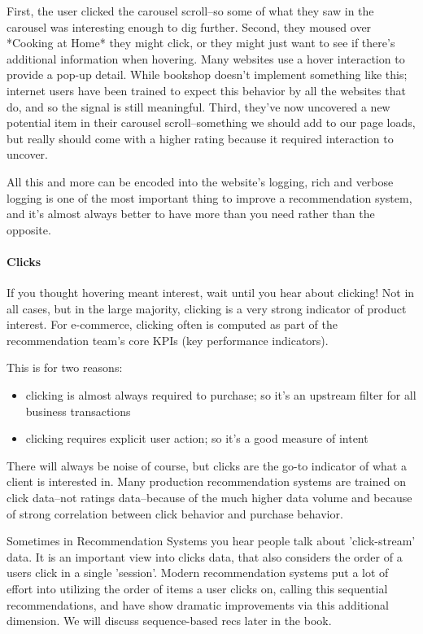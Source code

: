 First, the user clicked the carousel scroll–so some of what they saw in the carousel was interesting enough to dig further. Second, they moused over *Cooking at Home* they might click, or they might just want to see if there's additional information when hovering. Many websites use a hover interaction to provide a pop-up detail. While bookshop doesn't implement something like this; internet users have been trained to expect this behavior by all the websites that do, and so the signal is still meaningful. Third, they've now uncovered a new potential item in their carousel scroll–something we should add to our page loads, but really should come with a higher rating because it required interaction to uncover. 

All this and more can be encoded into the website's logging, rich and verbose logging is one of the most important thing to improve a recommendation system, and it's almost always better to have more than you need rather than the opposite.

\paragraph{Clicks}

If you thought hovering meant interest, wait until you hear about clicking! Not in all cases, but in the large majority, clicking is a very strong indicator of product interest. For e-commerce, clicking often is computed as part of the recommendation team's core KPIs (key performance indicators). 

This is for two reasons:

\begin{itemize}
\item clicking is almost always required to purchase; so it's an upstream filter for all business transactions
\item clicking requires explicit user action; so it's a good measure of intent
\end{itemize}

There will always be noise of course, but clicks are the go-to indicator of what a client is interested in. Many production recommendation systems are trained on click data–not ratings data–because of the much higher data volume and because of strong correlation between click behavior and purchase behavior. 


\vspace{10pt}
\colorbox{almond}{\parbox{\textwidth}{ Sometimes in Recommendation Systems you hear people talk about 'click-stream' data. It is an important view into clicks data, that also considers the order of a users click in a single 'session'. Modern recommendation systems put a lot of effort into utilizing the order of items a user clicks on, calling this sequential recommendations, and have show dramatic improvements via this additional dimension. We will discuss sequence-based recs later in the book.
}}
\vspace{10pt}

